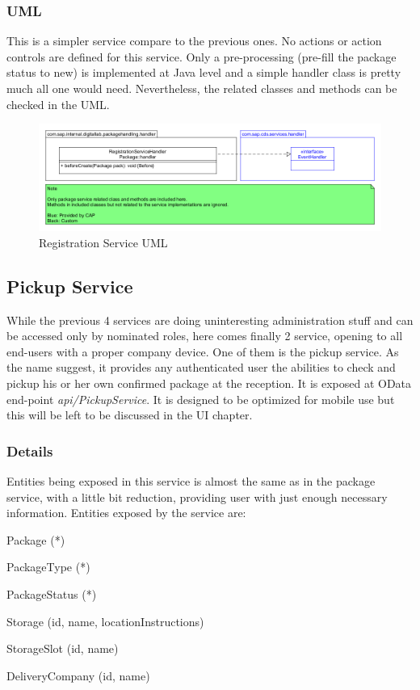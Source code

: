 \subsubsection{UML}

This is a simpler service compare to the previous ones. No actions or action controls are defined for this service. Only a pre-processing (pre-fill the package status to new) is implemented at Java level and a simple handler class is pretty much all one would need. Nevertheless, the related classes and methods can be checked in the UML. 

\begin{figure}[!h]
    \centering
    \includegraphics[width=1\linewidth]{images/service_class_diagrams/registration_service_class_diagram.png}
    \caption{Registration Service UML}
    \label{fig:registration_service_uml}
\end{figure}
\pagebreak




\subsection{Pickup Service}

While the previous 4 services are doing uninteresting administration stuff and can be accessed only by nominated roles, here comes finally 2 service, opening to all end-users with a proper company device. One of them is the pickup service. As the name suggest, it provides any authenticated user the abilities to check and pickup his or her own confirmed package at the reception. It is exposed at OData end-point \textit{api/PickupService}. It is designed to be optimized for mobile use but this will be left to be discussed in the UI chapter.

\subsubsection{Details}

Entities being exposed in this service is almost the same as in the package service, with a little bit reduction, providing user with just enough necessary information. Entities exposed by the service are:
\begin{compactenum}
	\item Package (*)
    \item PackageType (*)
    \item PackageStatus (*)
    \item Storage (id, name, locationInstructions)
    \item StorageSlot (id, name)
    \item DeliveryCompany (id, name)
\end{compactenum}

